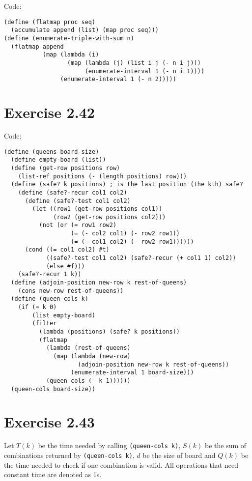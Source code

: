 \documentclass[../main.tex]{subfiles}
\begin{document}
Code:

\begin{lstlisting}
(define (flatmap proc seq)
  (accumulate append (list) (map proc seq)))
(define (enumerate-triple-with-sum n)
  (flatmap append
           (map (lambda (i)
                  (map (lambda (j) (list i j (- n i j)))
                       (enumerate-interval 1 (- n i 1))))
                (enumerate-interval 1 (- n 2)))))
\end{lstlisting}

\section{Exercise 2.42}

Code:

\begin{lstlisting}
(define (queens board-size)
  (define empty-board (list))
  (define (get-row positions row)
    (list-ref positions (- (length positions) row)))
  (define (safe? k positions) ; is the last position (the kth) safe?
    (define (safe?-recur col1 col2)
      (define (safe?-test col1 col2)
        (let ((row1 (get-row positions col1))
              (row2 (get-row positions col2)))
          (not (or (= row1 row2)
                   (= (- col2 col1) (- row2 row1))
                   (= (- col1 col2) (- row2 row1))))))
      (cond ((= col1 col2) #t)
            ((safe?-test col1 col2) (safe?-recur (+ col1 1) col2))
            (else #f)))
    (safe?-recur 1 k))
  (define (adjoin-position new-row k rest-of-queens)
    (cons new-row rest-of-queens))
  (define (queen-cols k)
    (if (= k 0)
        (list empty-board)
        (filter
          (lambda (positions) (safe? k positions))
          (flatmap
            (lambda (rest-of-queens)
              (map (lambda (new-row)
                     (adjoin-position new-row k rest-of-queens))
                   (enumerate-interval 1 board-size)))
            (queen-cols (- k 1))))))
  (queen-cols board-size))
\end{lstlisting}

\section{Exercise 2.43}

Let $T(k)$ be the time needed by calling \lstinline{(queen-cols k)},
 $S(k)$ be the sum of combinations returned by
 \lstinline{(queen-cols k)}, $d$ be the size of board and
 $Q(k)$ be the time needed to check if one combination
 is valid. All operations that need constant time
 are denoted as 1s.
\end{document}
